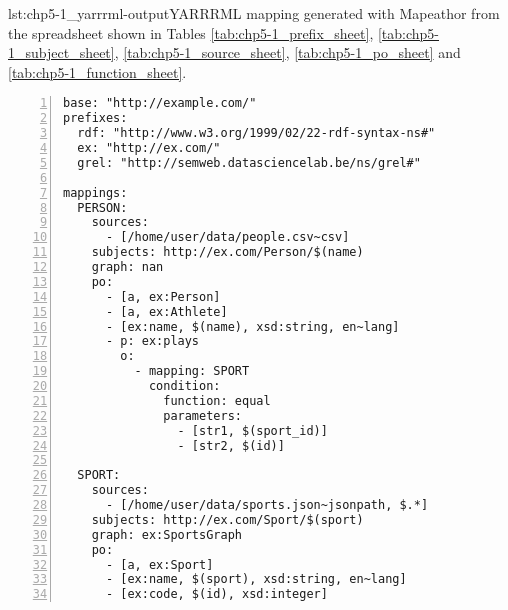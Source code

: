 \begin{captionedlisting}{lst:chp5-1_yarrrml-output}{YARRRML mapping generated with Mapeathor from the spreadsheet shown in Tables \ref{tab:chp5-1_prefix_sheet}, \ref{tab:chp5-1_subject_sheet}, \ref{tab:chp5-1_source_sheet}, \ref{tab:chp5-1_po_sheet} and \ref{tab:chp5-1_function_sheet}. }
\centering
{\begin{lstlisting}[numbers=left,basicstyle=\ttfamily\small,columns=flexible]
base: "http://example.com/"
prefixes:
  rdf: "http://www.w3.org/1999/02/22-rdf-syntax-ns#"
  ex: "http://ex.com/"
  grel: "http://semweb.datasciencelab.be/ns/grel#"

mappings:
  PERSON:
    sources:
      - [/home/user/data/people.csv~csv]
    subjects: http://ex.com/Person/$(name)
    graph: nan
    po:
      - [a, ex:Person]
      - [a, ex:Athlete]
      - [ex:name, $(name), xsd:string, en~lang]
      - p: ex:plays
        o:
          - mapping: SPORT
            condition:
              function: equal
              parameters:
                - [str1, $(sport_id)]
                - [str2, $(id)]
 
  SPORT:
    sources:
      - [/home/user/data/sports.json~jsonpath, $.*]
    subjects: http://ex.com/Sport/$(sport)
    graph: ex:SportsGraph
    po:
      - [a, ex:Sport]
      - [ex:name, $(sport), xsd:string, en~lang]
      - [ex:code, $(id), xsd:integer]
\end{lstlisting}}
\end{captionedlisting}